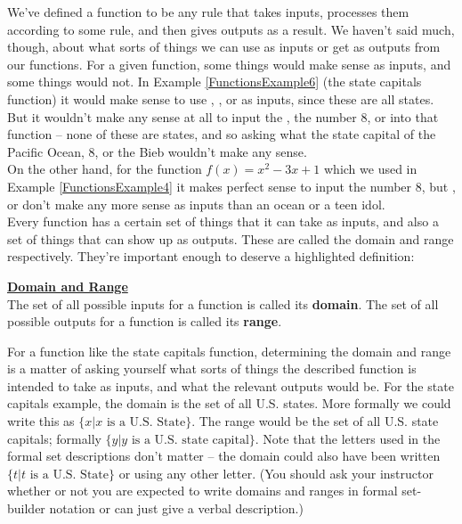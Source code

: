 We’ve defined a function to be any rule that takes inputs, processes them according to some rule, and then gives outputs as a result. We haven’t said much, though, about what sorts of things we can use as inputs or get as outputs from our functions. For a given function, some things would make sense as inputs, and some things would not. In Example \ref{FunctionsExample6} (the state capitals function) it would make sense to use , , or  as inputs, since these are all states. But it wouldn’t make any sense at all to input the , the number $8$, or  into that function – none of these are states, and so asking what the state capital of the Pacific Ocean, 8, or the Bieb wouldn’t make any sense.\\

On the other hand, for the function $f(x)=x^2-3x+1$ which we used in Example \ref{FunctionsExample4} it makes perfect sense to input the number 8, but ,  or  don’t make any more sense as inputs than an ocean or a teen idol.\\

Every function has a certain set of things that it can take as inputs, and also a set of things that can show up as outputs. These are called the domain and range respectively. They’re important enough to deserve a highlighted definition:\\

\begin{definition}
	 
	\textbf{\underline{Domain and Range}}\\
	\bigskip
	The set of all possible inputs for a function is called its \textbf{domain}. The set of all possible outputs for a function is called its \textbf{range}.
\end{definition}

\bigskip

For a function like the state capitals function, determining the domain and range is a matter of asking yourself what sorts of things the described function is intended to take as inputs, and what the relevant outputs would be. For the state capitals example, the domain is the set of all U.S. states. More formally we could write this as $\{ x \vert x \text{ is a U.S. State} \}$. The range would be the set of all U.S. state capitals; formally $\{ y \vert y \text{ is a U.S. state capital}\}$. Note that the letters used in the formal set descriptions don’t matter -- the domain could also have been written $\{ t \vert t \text{ is a U.S. State} \}$ or using any other letter.  (You should ask your instructor whether or not you are expected to write domains and ranges in formal set-builder notation or can just give a verbal description.)

